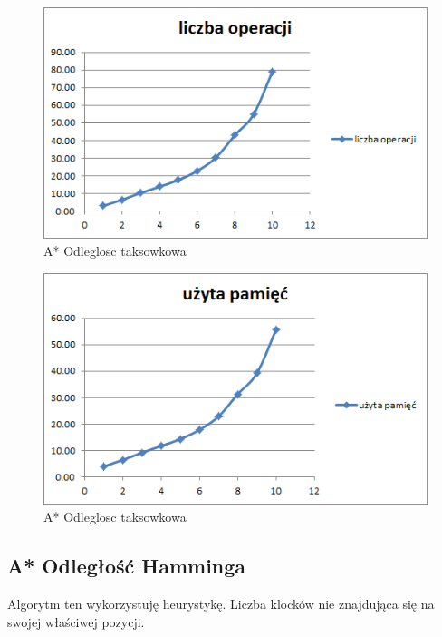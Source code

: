 \documentclass{classrep}
\begin{document}
\begin{figure}[ht]
\centering
			\includegraphics[scale=0.65]{pictures/A1_operacje.png}
	\caption{A* Odleglosc taksowkowa}
	\label{fig:A* Odleglosc taksowkowa}
\end{figure}

\begin{figure}[ht]
\centering
			\includegraphics[scale=0.65]{pictures/A1_space.png}
	\caption{A* Odleglosc taksowkowa}
	\label{fig:A* Odleglosc taksowkowa}
\end{figure}


\cleardoublepage
  \subsection{A* Odległość Hamminga}
  Algorytm ten wykorzystuję heurystykę. Liczba klocków nie znajdująca się na swojej właściwej pozycji.
  
\end{document}
